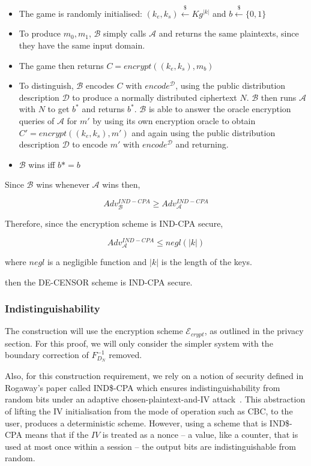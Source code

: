 \documentclass[ %
                    author={Samuel Russell},
                supervisor={Prof. Bogdan Warinschi},
                    degree={MEng},
                     title={Innocuous Ciphertexts},
                  subtitle={The DE-CENSOR Scheme},
                      type={research},
                      year={2018} ]{dissertation}
\begin{document}
\begin{itemize}


\item The game is randomly initialised: $(k_e, k_s) \xleftarrow{\$} Kg^{|k|}$ and $b \xleftarrow{\$} \{0,1\}$

\item To produce $m_0, m_1$, $\mathcal{B}$ simply calls  $\mathcal{A}$ and returns the same plaintexts, since they have the same input domain.

\item The game then returns $C = encrypt((k_e, k_s), m_b)$

\item To distinguish, $\mathcal{B}$ encodes $C$ with $encode^\mathcal{D}$, using the public distribution description $\mathcal{D}$ to produce a normally distributed ciphertext $N$. $\mathcal{B}$ then runs $\mathcal{A}$ with $N$ to get $b^*$ and returns $b^*$. $\mathcal{B}$ is able to answer the oracle encryption queries of $\mathcal{A}$ for $m'$ by using its own encryption oracle to obtain $C' = encrypt( (k_e, k_s), m')$ and again using the public distribution description $\mathcal{D}$ to encode $m'$ with $encode^\mathcal{D}$ and returning.

\item $\mathcal{B}$ wins iff $b* = b$

\end{itemize}

Since $\mathcal{B}$ wins whenever $\mathcal{A}$ wins then,

$$Adv_\mathcal{B}^{IND-CPA} \geq Adv_\mathcal{A}^{IND-CPA}$$

Therefore, since the encryption scheme is IND-CPA secure,

$$Adv_\mathcal{A}^{IND-CPA} \leq negl(|k|)$$

where $negl$ is a negligible function and $|k|$ is the length of the keys.

then the DE-CENSOR scheme is IND-CPA secure.

\subsubsection{Indistinguishability}


The construction will use the encryption scheme $\mathcal{E}_{crypt}$, as outlined in the privacy section.
For this proof, we will only consider the simpler system with the boundary correction of $F^{-1}_{D_N}$ removed.

Also, for this construction requirement, we rely on a notion of security defined in Rogaway's paper called IND\$-CPA which ensures indistinguishability from random bits under an adaptive chosen-plaintext-and-IV attack~\cite{ind_dollar}.
This abstraction of lifting the IV initialisation from the mode of operation such as CBC, to the user, produces a deterministic scheme.
However, using a scheme that is IND\$-CPA means that if the $IV$ is treated as a nonce -- a value, like a counter, that is used at most once within a session -- the output bits are indistinguishable from random.
\end{document}
